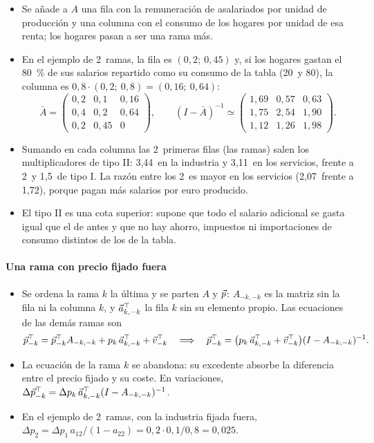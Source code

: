 \documentclass[11pt]{article}
\begin{document}
\begin{itemize}
\item Se añade a $A$ una fila con la remuneración de asalariados por unidad de producción y una columna con el consumo de los hogares por unidad de esa renta; los hogares pasan a ser una rama más.
\item En el ejemplo de 2~ramas, la fila es $(0{,}2;\ 0{,}45)$ y, si los hogares gastan el 80~\% de sus salarios repartido como su consumo de la tabla (20~y 80), la columna es $0{,}8\cdot(0{,}2;\ 0{,}8)=(0{,}16;\ 0{,}64)$:
\[
\bar A=\begin{pmatrix}0{,}2 & 0{,}1 & 0{,}16\\ 0{,}4 & 0{,}2 & 0{,}64\\ 0{,}2 & 0{,}45 & 0\end{pmatrix},\qquad (I-\bar A)^{-1}\simeq\begin{pmatrix}1{,}69 & 0{,}57 & 0{,}63\\ 1{,}75 & 2{,}54 & 1{,}90\\ 1{,}12 & 1{,}26 & 1{,}98\end{pmatrix}.
\]
\item Sumando en cada columna las 2~primeras filas (las ramas) salen los multiplicadores de tipo II: 3,44~en la industria y 3,11~en los servicios, frente a 2~y 1,5~de tipo I. La razón entre los 2~es mayor en los servicios (2,07~frente a 1,72), porque pagan más salarios por euro producido.
\item El tipo II es una cota superior: supone que todo el salario adicional se gasta igual que el de antes y que no hay ahorro, impuestos ni importaciones de consumo distintos de los de la tabla\nocite{MillerBlair2022}.
\end{itemize}

\paragraph{Una rama con precio fijado fuera}

\begin{itemize}
\item Se ordena la rama $k$ la última y se parten $A$ y $\vec{p}$: $A_{-k,-k}$ es la matriz sin la fila ni la columna $k$, y $\vec{a}_{k,-k}^{\top}$ la fila $k$ sin su elemento propio. Las ecuaciones de las demás ramas son
\[
\vec{p}_{-k}^{\top}=\vec{p}_{-k}^{\top}A_{-k,-k}+p_k\,\vec{a}_{k,-k}^{\top}+\vec{v}_{-k}^{\top}\quad\Longrightarrow\quad\vec{p}_{-k}^{\top}=\bigl(p_k\,\vec{a}_{k,-k}^{\top}+\vec{v}_{-k}^{\top}\bigr)(I-A_{-k,-k})^{-1}.
\]
\item La ecuación de la rama $k$ se abandona: su excedente absorbe la diferencia entre el precio fijado y su coste. En variaciones, $\Delta\vec{p}_{-k}^{\top}=\Delta p_k\,\vec{a}_{k,-k}^{\top}(I-A_{-k,-k})^{-1}$.
\item En el ejemplo de 2~ramas, con la industria fijada fuera, $\Delta p_2=\Delta p_1\,a_{12}/(1-a_{22})=0{,}2\cdot0{,}1/0{,}8=0{,}025$.
\end{itemize}
\end{document}
